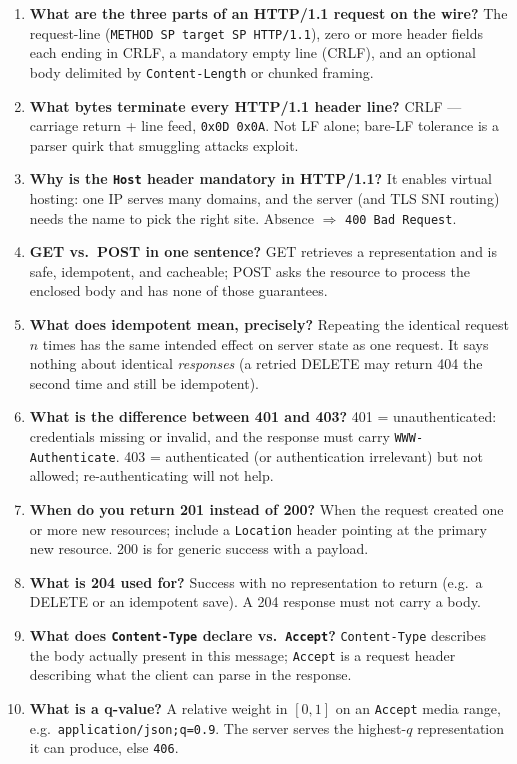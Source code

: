 \begin{enumerate}[label=\textbf{Q\arabic*.}, leftmargin=2.8em]
  \item \textbf{What are the three parts of an HTTP/1.1 request on the wire?} The request-line (\texttt{METHOD SP target SP HTTP/1.1}), zero or more header fields each ending in CRLF, a mandatory empty line (CRLF), and an optional body delimited by \texttt{Content-Length} or chunked framing.
  \item \textbf{What bytes terminate every HTTP/1.1 header line?} CRLF --- carriage return + line feed, \texttt{0x0D 0x0A}. Not LF alone; bare-LF tolerance is a parser quirk that smuggling attacks exploit.
  \item \textbf{Why is the \texttt{Host} header mandatory in HTTP/1.1?} It enables virtual hosting: one IP serves many domains, and the server (and TLS SNI routing) needs the name to pick the right site. Absence $\Rightarrow$ \texttt{400 Bad Request}.
  \item \textbf{GET vs.\ POST in one sentence?} GET retrieves a representation and is safe, idempotent, and cacheable; POST asks the resource to process the enclosed body and has none of those guarantees.
  \item \textbf{What does idempotent mean, precisely?} Repeating the identical request $n$ times has the same intended effect on server state as one request. It says nothing about identical \emph{responses} (a retried DELETE may return 404 the second time and still be idempotent).
  \item \textbf{What is the difference between 401 and 403?} 401 = unauthenticated: credentials missing or invalid, and the response must carry \texttt{WWW-Authenticate}. 403 = authenticated (or authentication irrelevant) but not allowed; re-authenticating will not help.
  \item \textbf{When do you return 201 instead of 200?} When the request created one or more new resources; include a \texttt{Location} header pointing at the primary new resource. 200 is for generic success with a payload.
  \item \textbf{What is 204 used for?} Success with no representation to return (e.g.\ a DELETE or an idempotent save). A 204 response must not carry a body.
  \item \textbf{What does \texttt{Content-Type} declare vs.\ \texttt{Accept}?} \texttt{Content-Type} describes the body actually present in this message; \texttt{Accept} is a request header describing what the client can parse in the response.
  \item \textbf{What is a q-value?} A relative weight in $[0,1]$ on an \texttt{Accept} media range, e.g.\ \texttt{application/json;q=0.9}. The server serves the highest-$q$ representation it can produce, else \texttt{406}.

\end{enumerate}
